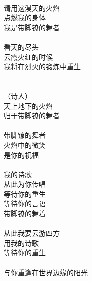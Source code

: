 \\
请用这漫天的火焰\\
点燃我的身体\\
我是带脚镣的舞者\\
\\
看天的尽头\\
云霞火红的时候\\
我将在烈火的锻炼中重生\\
\\
\\
（诗人）\\
天上地下的火焰\\
归于带脚镣的舞者\\
\\
带脚镣的舞者\\
火焰中的微笑\\
是你的祝福\\
\\
我的诗歌\\
从此为你传唱\\
等待你的重生\\
等待你的言语\\
带脚镣的舞着\\
\\
从此我要云游四方\\
用我的诗歌\\
等待你的重生\\
\\
与你重逢在世界边缘的阳光
